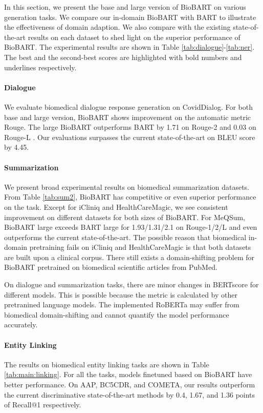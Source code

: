\documentclass[11pt]{article}
\begin{document}
In this section, we present the base and large version of BioBART on various generation tasks. We compare our in-domain BioBART with BART to illustrate the effectiveness of domain adaption. We also compare with the existing state-of-the-art results on each dataset to shed light on the superior performance of BioBART. The experimental results are shown in Table \ref{tab:dialogue}-\ref{tab:ner}. The best and the second-best scores are highlighted with bold numbers and underlines respectively.

\paragraph{Dialogue} We evaluate biomedical dialogue response generation on CovidDialog. For both base and large version, BioBART shows improvement on the automatic metric Rouge. The large BioBART outperforms BART by 1.71 on Rouge-2 and 0.03 on Rouge-L . Our evaluations surpasses the current state-of-the-art on BLEU score by 4.45.

\paragraph{Summarization} We present broad experimental results on biomedical summarization datasets. From Table \ref{tab:sum2}, BioBART has competitive or even superior performance on the task. Except for iCliniq and HealthCareMagic, we see consistent improvement on different datasets for both sizes of BioBART. For MeQSum, BioBART large exceeds BART large for 1.93/1.31/2.1 on Rouge-1/2/L and even outperforms the current state-of-the-art. The possible reason that biomedical in-domain pretraining fails on iCliniq and HealthCareMagic is that both datasets are built upon a clinical corpus. There still exists a domain-shifting problem for BioBART pretrained on biomedical scientific articles from PubMed.

On dialogue and summarization tasks, there are minor changes in BERTscore for different models. This is possible because the metric is calculated by other pretranined language models. The implemented RoBERTa may suffer from biomedical domain-shifting and cannot quantify the model performance accurately. 

\paragraph{Entity Linking} The results on biomedical entity linking tasks are shown in Table \ref{tab:main:linking}. For all the tasks, models finetuned based on BioBART have better performance. On AAP, BC5CDR, and COMETA, our results outperform the current discriminative state-of-the-art methods by 0.4, 1.67, and 1.36 points of Recall@1 respectively. 
\end{document}
